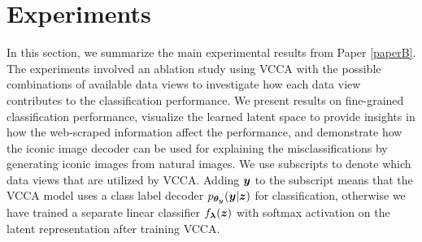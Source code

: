 

\section{Experiments}\label{chap3:sec:experiments}

In this section, we summarize the main experimental results from Paper \ref{paperB}. The experiments involved an ablation study using VCCA with the possible combinations of available data views to investigate how each data view contributes to the classification performance. 
We present results on fine-grained classification performance, visualize the learned latent space to provide insights in how the web-scraped information affect the performance, and demonstrate how the iconic image decoder can be used for explaining the misclassifications by generating iconic images from natural images. 
We use subscripts to denote which data views that are utilized by VCCA. Adding ${\bm{y}}$ to the subscript means that the VCCA model uses a class label decoder $p_{{\bm{\theta}}_{{\bm{y}}}}({\bm{y}} | {\bm{z}})$ for classification, otherwise we have trained a separate linear classifier $f_{{\bm{\lambda}}}({\bm{z}})$ with softmax activation on the latent representation after training VCCA. 




